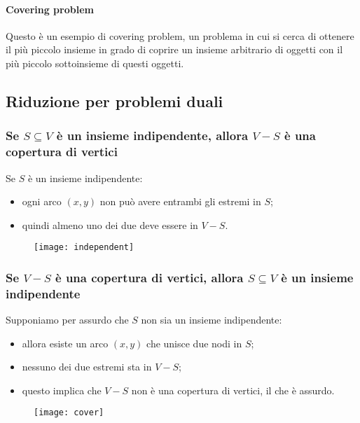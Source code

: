 \paragraph{Covering problem}
Questo è un esempio di covering problem, un problema in cui si cerca di ottenere il più piccolo insieme in grado di coprire un insieme arbitrario di oggetti con il più piccolo sottoinsieme di questi oggetti.

\subsection{Riduzione per problemi duali}

\subsubsection{Se \texorpdfstring{\(S \subseteq V\)}{S sottoinsieme di V} è un insieme indipendente, allora \texorpdfstring{\(V - S\)}{V - S} è una copertura di vertici}

Se \(S\) è un insieme indipendente:
\begin{itemize}
    \item ogni arco \((x,y)\) non può avere entrambi gli estremi in \(S\);
    \item quindi almeno uno dei due deve essere in \(V-S\).
\end{itemize}
\begin{figure}[H]\centering
	\texttt{[image: independent]}
\end{figure}

\subsubsection{Se \texorpdfstring{\(V - S\)}{V - S} è una copertura di vertici, allora \texorpdfstring{\(S \subseteq V\)}{S sottoinsieme di V} è un insieme indipendente}

Supponiamo per assurdo che \(S\) non sia un insieme indipendente:
\begin{itemize}
    \item allora esiste un arco \((x,y)\) che unisce due nodi in \(S\);
    \item nessuno dei due estremi sta in \(V-S\);
    \item questo implica che \(V-S\) non è una copertura di vertici, il che è assurdo.
\end{itemize}
\begin{figure}[H]\centering
	\texttt{[image: cover]}
\end{figure}

